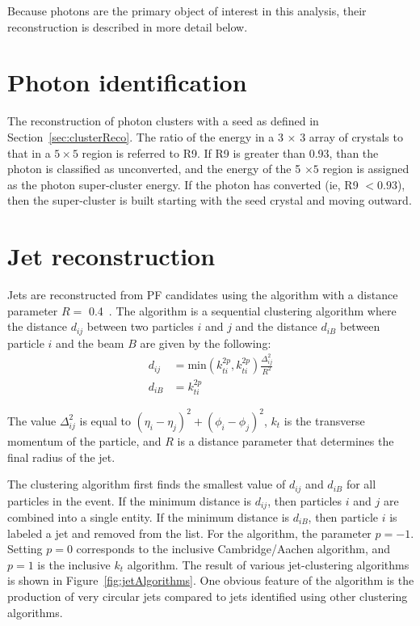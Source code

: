 Because photons are the primary object of interest in this analysis, their reconstruction is described in more detail below. 

\section{Photon identification}
\label{sec:phoReco}




The reconstruction of photon clusters with a seed as defined in Section~\ref{sec:clusterReco}. The ratio of the energy in a 3 $\times$ 3 array of crystals to that in a $5 \times 5$ region is referred to R9. If R9 is greater than 0.93, than the photon is classified as unconverted, and the energy of the 5 $\times 5$ region is assigned as the photon super-cluster energy. If the photon has converted (ie, R9 $< 0.93$), then the super-cluster is built starting with the seed crystal and moving outward.





\section{Jet reconstruction}
\label{sec:Jet}
Jets are reconstructed from PF candidates using the \antikt algorithm with a distance parameter $R =$ 0.4~\cite{antikt}.  The \antikt algorithm is a sequential clustering algorithm where the distance $d_{ij}$ between two particles $i$ and $j$ and the distance $d_{iB}$ between particle $i$ and the beam $B$ are given by the following: 
\begin{equation}
\begin{aligned}
d_{ij} &= \mathrm{min}(k_{ti}^{2p},k_{ti}^{2p})\frac{\Delta^2_{ij}}{R^2} \\
d_{iB} &= k_{ti}^{2p}
\end{aligned}
\end{equation}

The value $\Delta^2_{ij}$ is equal to $(\eta_i - \eta_j)^2 + (\phi_i - \phi_j)^2$, $k_t$ is the transverse momentum of the particle, and $R$ is a distance parameter that determines the final radius of the jet.

The clustering algorithm first finds the smallest value of $d_{ij}$ and $d_{iB}$ for all particles in the event. If the minimum distance is $d_{ij}$, then particles $i$ and $j$ are combined into a single entity. If the minimum distance is $d_{iB}$, then particle $i$ is labeled a jet and removed from the list. For the \antikt algorithm, the parameter $p = -1$. Setting $p=0$ corresponds to the inclusive Cambridge/Aachen algorithm, and $p=1$ is the inclusive $k_t$ algorithm. The result of various jet-clustering algorithms is shown in Figure~\ref{fig:jetAlgorithms}. One obvious feature of the \antikt algorithm is the production of very circular jets compared to jets identified using other clustering algorithms.
 
